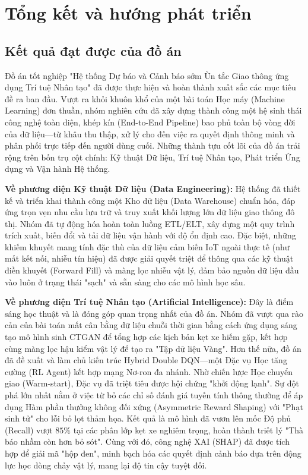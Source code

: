 \section{Tổng kết và hướng phát triển}
\label{ch:9}

\subsection{Kết quả đạt được của đồ án}

Đồ án tốt nghiệp "Hệ thống Dự báo và Cảnh báo sớm Ùn tắc Giao thông ứng dụng Trí tuệ Nhân tạo" đã được thực hiện và hoàn thành xuất sắc các mục tiêu đề ra ban đầu. Vượt ra khỏi khuôn khổ của một bài toán Học máy (Machine Learning) đơn thuần, nhóm nghiên cứu đã xây dựng thành công một hệ sinh thái công nghệ toàn diện, khép kín (End-to-End Pipeline) bao phủ toàn bộ vòng đời của dữ liệu—từ khâu thu thập, xử lý cho đến việc ra quyết định thông minh và phân phối trực tiếp đến người dùng cuối. Những thành tựu cốt lõi của đồ án trải rộng trên bốn trụ cột chính: Kỹ thuật Dữ liệu, Trí tuệ Nhân tạo, Phát triển Ứng dụng và Vận hành Hệ thống.

\textbf{Về phương diện Kỹ thuật Dữ liệu (Data Engineering):} Hệ thống đã thiết kế và triển khai thành công một Kho dữ liệu (Data Warehouse) chuẩn hóa, đáp ứng trọn vẹn nhu cầu lưu trữ và truy xuất khối lượng lớn dữ liệu giao thông đô thị. Nhóm đã tự động hóa hoàn toàn luồng ETL/ELT, xây dựng một quy trình trích xuất, biến đổi và tải dữ liệu vận hành với độ ổn định cao. Đặc biệt, những khiếm khuyết mang tính đặc thù của dữ liệu cảm biến IoT ngoài thực tế (như mất kết nối, nhiễu tín hiệu) đã được giải quyết triệt để thông qua các kỹ thuật điền khuyết (Forward Fill) và màng lọc nhiễu vật lý, đảm bảo nguồn dữ liệu đầu vào luôn ở trạng thái "sạch" và sẵn sàng cho các mô hình học sâu.

\textbf{Về phương diện Trí tuệ Nhân tạo (Artificial Intelligence):} Đây là điểm sáng học thuật và là đóng góp quan trọng nhất của đồ án. Nhóm đã vượt qua rào cản của bài toán mất cân bằng dữ liệu chuỗi thời gian bằng cách ứng dụng sáng tạo mô hình sinh CTGAN để tổng hợp các kịch bản kẹt xe hiếm gặp, kết hợp cùng màng lọc hậu kiểm vật lý để tạo ra "Tập dữ liệu Vàng". Hơn thế nữa, đồ án đã đề xuất và làm chủ kiến trúc Hybrid Double DQN—một Đặc vụ Học tăng cường (RL Agent) kết hợp mạng Nơ-ron đa nhánh. Nhờ chiến lược Học chuyển giao (Warm-start), Đặc vụ đã triệt tiêu được hội chứng "khởi động lạnh". Sự đột phá lớn nhất nằm ở việc từ bỏ các chỉ số đánh giá tuyến tính thông thường để áp dụng Hàm phần thưởng không đối xứng (Asymmetric Reward Shaping) với "Phạt sinh tử" cho lỗi bỏ lọt thảm họa. Kết quả là mô hình đã vươn lên mốc Độ phủ (Recall) vượt $85\%$ tại các phân lớp kẹt xe nghiêm trọng, hoàn thành triết lý "Thà báo nhầm còn hơn bỏ sót". Cùng với đó, công nghệ XAI (SHAP) đã được tích hợp để giải mã "hộp đen", minh bạch hóa các quyết định cảnh báo dựa trên động lực học dòng chảy vật lý, mang lại độ tin cậy tuyệt đối.

